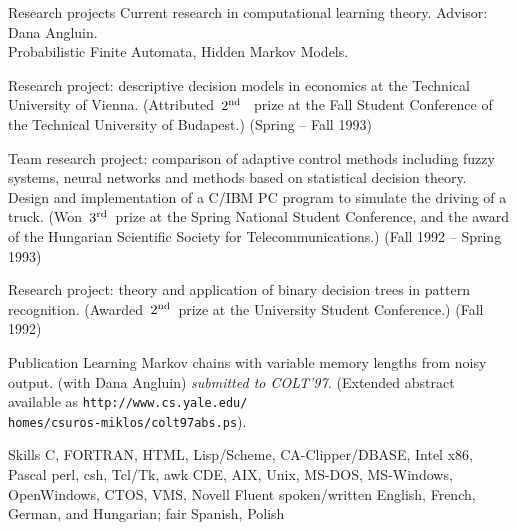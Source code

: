 \documentclass{resume}
\newcommand{\second}{$2^{\mbox{\scriptsize nd}}$\ }
\newcommand{\third}{$3^{\mbox{\scriptsize rd}}$\ }
\def\tub{Technical University of Budapest}
\def\TUB {\tub}
\begin{document}
\begin{category}{Research projects}
\citembullet Current research in computational learning theory. 
Advisor: Dana Angluin.\\
Probabilistic Finite Automata, Hidden Markov Models.

\citembullet
Research project: descriptive decision models in
economics at the Technical University of Vienna. (Attributed~\second
prize at the Fall Student Conference of the \TUB.) (Spring -- Fall 1993)

\citembullet
Team research project: comparison of adaptive control
methods including fuzzy systems, neural networks and methods based on 
statistical decision theory. Design and implementation of 
a C/IBM PC program to 
simulate the driving of a truck. (Won~\third prize at the Spring National 
Student Conference, and the award of the Hungarian Scientific Society 
for Telecommunications.)
(Fall 1992 -- Spring 1993)

\citembullet
Research project: theory and application of binary 
decision trees in pattern recognition. (Awarded~\second prize at the
University Student Conference.) (Fall 1992)
\end{category}


\begin{category}{Publication}
\citemnobullet Learning Markov chains with variable memory 
lengths from noisy output. (with Dana Angluin) {\it submitted to COLT'97.}
(Extended abstract available as {\tt http://www.cs.yale.edu/\\homes/csuros-miklos/colt97abs.ps}).
\end{category}

\newpage

\begin{category}{Skills}
\citembullet C, FORTRAN, HTML, Lisp/Scheme, CA-Clipper/DBASE, 
	Intel x86, Pascal
\citembullet perl, csh, Tcl/Tk, awk
\citembullet CDE, AIX, Unix, MS-DOS, MS-Windows, OpenWindows, CTOS, VMS, 
	Novell
\citembullet Fluent spoken/written English, French, German, and Hungarian; fair Spanish,
Polish
\end{category}

\end{document}
